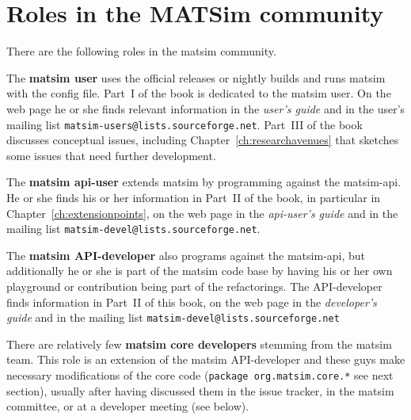 \section{Roles in the MATSim community}
\label{sec:roles}
There are the following roles in the \gls{matsim} community.
%
\begin{compactitem}
\item The \textbf{\gls{matsim} user} uses the official releases or nightly builds and runs \gls{matsim} with the config file. Part~I of the book is dedicated to the \gls{matsim} user. On the web page he or she finds relevant information in the \emph{user's guide} and in the user's mailing list \lstinline|matsim-users@lists.sourceforge.net|.
%
Part~III of the book discusses conceptual issues, including Chapter~\ref{ch:researchavenues} that sketches some issues that need further development.
%
\item The \textbf{\gls{matsim} \gls{api}-user} extends \gls{matsim} by programming against the \gls{matsim}-\gls{api}. He or she finds his or her information in Part~II of the book, in particular in Chapter~\ref{ch:extensionpoints}, on the web page in the \emph{\gls{api}-user's guide} and in the mailing list \lstinline|matsim-devel@lists.sourceforge.net|.
%
\item The \textbf{\gls{matsim} API-developer} also programs against the \gls{matsim}-\gls{api}, but additionally he or she is part of the \gls{matsim} code base by having his or her own playground or \gls{contribution} being part of the refactorings. 
The API-developer finds information in Part~II of this book, on the web page in the \emph{developer's guide} and in the mailing list \lstinline|matsim-devel@lists.sourceforge.net| 
%
\item There are relatively few \textbf{\gls{matsim} core developers} stemming from the \gls{matsim} team. This role is an extension of the \gls{matsim} API-developer and these guys make necessary modifications of the core code (\lstinline|package org.matsim.core.*| see next section), usually after having discussed them in the issue tracker, in the \gls{matsim} committee, or at a developer meeting (see below). 
%

\end{compactitem}
%
